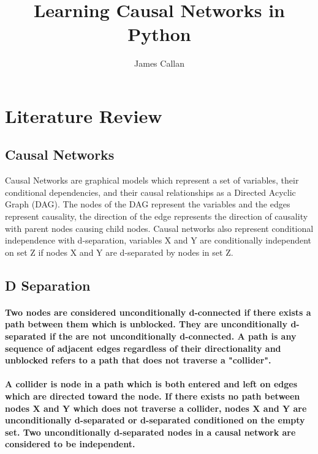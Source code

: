 \documentclass{article}
\begin{document}
\title{Learning Causal Networks in Python}
\author{James Callan}
\date{}

\maketitle

\newpage

\section{Literature Review}

\subsection{Causal Networks}

Causal Networks are graphical models which represent a set of variables, their conditional dependencies, and their causal relationships  as a Directed Acyclic Graph (DAG). The nodes of the DAG represent the variables and the edges represent causality, the direction of the edge represents the direction of causality with parent nodes causing child nodes. Causal networks also represent conditional independence with d-separation, variables X and Y are conditionally independent on set Z if nodes X and Y are d-separated by nodes in set Z.

\subsection{D Separation}
\paragraph{Two nodes are considered unconditionally  d-connected if there exists a path between them which is unblocked. They are unconditionally d-separated if the are not unconditionally d-connected. A path is any sequence of adjacent edges regardless of their directionality and unblocked refers to a path that does not traverse a "collider".}

\paragraph{A collider is node in a path which is both entered and left on edges which are directed toward the node. If there exists no path between nodes X and Y which does not traverse a collider, nodes X and Y are unconditionally d-separated or d-separated conditioned on the empty set. Two unconditionally d-separated nodes in a causal network are considered to be independent.}
\end{document}
